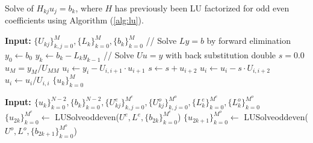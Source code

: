 \documentclass[11pt, oneside]{article}
\begin{document}
\begin{algorithm}
\caption{Solve of $H_{kj}u_j = b_k$, where $H$ has previously been LU 
factorized for odd even coefficients using Algorithm (\ref{alg:lu}).}
\label{alg:lusolve}
\begin{algorithmic}[1]
  \State \textbf{Input:} $\{U_{kj}\}_{k,j=0}^{M}, \{L_k\}_{k=0}^{M}, 
\{b_k\}_{k=0}^{M}$ 
  \State // Solve $Ly=b$ by forward elimination 
  \State $y_0 \gets b_0$
    \State $y_k \gets b_k - L_ky_{k-1}$
  \EndFor
  \State // Solve $Uu=y$ with back substitution
  \State double $s = 0.0$     
  \State $u_M = y_M / U_{MM}$    
     \State $u_i \gets y_i - U_{i, i+1}\cdot u_{i+1}$
       \State $s \gets s + u_{i+2}$
       \State $u_i \gets u_i - s\cdot U_{i,i+2}$            
     \EndIf
     \State $u_i \gets  u_i / U_{i,i}$
   \EndFor
  \State \Return $\{u_k\}_{k=0}^{M}$  
\EndProcedure
\end{algorithmic}
\begin{algorithmic}[1]
  \State \textbf{Input: $\{u_k\}_{k=0}^{N-2}, \{b_k\}_{k=0}^{N-2}, 
\{U_{kj}^{e}\}_{k,j=0}^{M^{e}}, \{U_{kj}^{o}\}_{k,j=0}^{M^{o}}, 
\{L^{e}_k\}_{k=0}^{M^{e}}, \{L^{o}_k\}_{k=0}^{M^{o}}$}
  \State $\{u_{2k}\}_{k=0}^{M^e} \gets $ LUSolveoddeven($U^{e}, L^e, 
\{b_{2k}\}_{k=0}^{M^e}$)
  \State $\{u_{2k+1}\}_{k=0}^{M^o} \gets $ LUSolveoddeven($U^{o}, L^o, 
\{b_{2k+1}\}_{k=0}^{M^o}$)
  
\EndProcedure
\end{algorithmic}
\end{algorithm}
\end{document}
